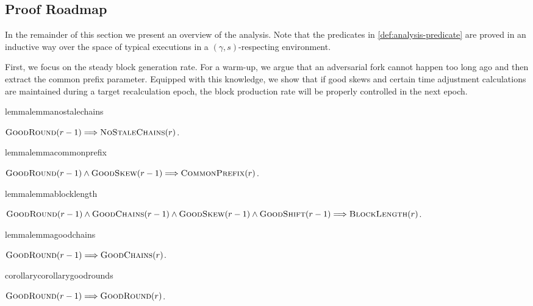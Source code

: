 \subsection{Proof Roadmap}

In the remainder of this section we present an overview of the analysis.
%
Note that the predicates in \cref{def:analysis-predicate} are proved in an inductive way over the space of typical executions in a $(\gamma, s)$-respecting environment.

First, we focus on the steady block generation rate.
%
For a warm-up, we argue that an adversarial fork cannot happen too long ago and then extract the common prefix parameter.
%
Equipped with this knowledge, we show that if good skews and certain time adjustment calculations are maintained during a target recalculation epoch, the block production rate will be properly controlled in the next epoch.

\begin{restatable*}{lemma}{lemmanostalechains}
    \label{lemma:nostalechains}

    $\textsc{GoodRound}(r - 1) \Longrightarrow \textsc{NoStaleChains}(r)$.
\end{restatable*}

\begin{restatable*}{lemma}{lemmacommonprefix}
    \label{lemma:commonprefix}

    $\textsc{GoodRound}(r - 1) \wedge \textsc{GoodSkew}(r - 1) \Longrightarrow \textsc{CommonPrefix}(r)$.
\end{restatable*}

\begin{restatable*}{lemma}{lemmablocklength}
    \label{lemma:blocklength}

    $\textsc{GoodRound}(r - 1) \wedge \textsc{GoodChains}(r - 1) \wedge \textsc{GoodSkew}(r - 1) \wedge \textsc{GoodShift}(r - 1) \Longrightarrow \textsc{BlockLength}(r)$.
\end{restatable*}

\begin{restatable*}{lemma}{lemmagoodchains}
    \label{lemma:goodchains}

    $\textsc{GoodRound}(r - 1) \Longrightarrow \textsc{GoodChains}(r)$.
\end{restatable*}

\begin{restatable*}{corollary}{corollarygoodrounds}
    \label{corollary:goodrounds}

    $\textsc{GoodRound}(r - 1) \Longrightarrow \textsc{GoodRound}(r)$.
\end{restatable*}

